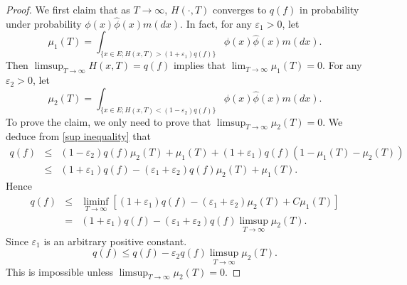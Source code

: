 \documentclass[12pt,a4paper]{amsart}
\numberwithin{equation}{section}
\theoremstyle{plain}
\theoremstyle{definition}
\theoremstyle{remark}
\begin{document}
\begin{proof}
We first claim that  as $T\to\infty$, $H(\cdot,T)$ converges to $q(f)$ in probability under probability
$\phi(x)\widehat{\phi}(x)m(dx)$. In fact,
 for any $\varepsilon_1>0$, let
$$
\mu_1(T)=\int_{\{x\in E;H(x,T)>(1+\varepsilon_1)q(f)\}}
\phi(x)\widehat\phi(x)m(dx).
$$
Then $\limsup_{T\to\infty}H(x,T)=q(f)$ implies that $\lim_{T\rightarrow\infty}\mu_1(T)=0.$  For any $\varepsilon_2>0$, let
$$
\mu_2(T)=\int_{\{x\in E;H(x,T)<(1-\varepsilon_2)q(f)\}}
\phi(x)\widehat\phi(x)m(dx).
$$
To prove the claim, we only need to prove that  $\limsup_{T\rightarrow\infty}\mu_2(T)=0.$
 We deduce from \eqref{sup inequality} that
\begin{eqnarray}\label{sublimitinprob}
q(f)&\leq&
(1-\varepsilon_2)q(f)\mu_2(T)+\mu_1(T)+(1+\varepsilon_1)q(f)(1-\mu_1(T)-\mu_2(T))\\
&\le
&(1+\varepsilon_1)q(f)-(\varepsilon_1+\varepsilon_2)q(f)\mu_2(T)+\mu_1(T).
\end{eqnarray}
 Hence
\begin{eqnarray*}\label{sublimitinequl}
q(f)&\leq&
\liminf_{T\rightarrow\infty}\left[(1+\varepsilon_1)q(f)-(\varepsilon_1+\varepsilon_2)\mu_2(T)+C\mu_1(T)\right]\\
&=&(1+\varepsilon_1)q(f)-(\varepsilon_1+\varepsilon_2)q(f)\limsup_{T\rightarrow\infty}\mu_2(T).
\end{eqnarray*}
Since $\varepsilon_1$ is an arbitrary positive constant.
\[
q(f)\leq q(f)-\varepsilon_2 q(f)\limsup_{T\rightarrow\infty}\mu_2(T).
\]
This is impossible unless $\limsup_{T\rightarrow\infty}\mu_2(T)=0.$




\end{proof}
\end{document}
